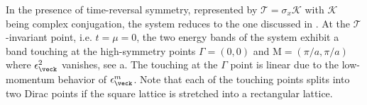 In the presence of time-reversal symmetry, represented by $\mathcal{T}=\sigma_x \mathcal{K}$ with $\mathcal{K}$ being complex conjugation, the system reduces to the one discussed in .
At the $\mathcal{T}$-invariant point, i.e. $t=\mu=0$, the two energy bands of the system exhibit a band touching at the high-symmetry points $\Gamma=(0,0)$ and $\text{M}=(\pi/a, \pi/a)$ where $\epsilon^2_\veck$ vanishes, see a.
The touching at the $\Gamma$ point is linear due to the low-momentum behavior of $\epsilon^m_\veck$.
Note that each of the touching points splits into two Dirac points if the square lattice is stretched into a rectangular lattice.

